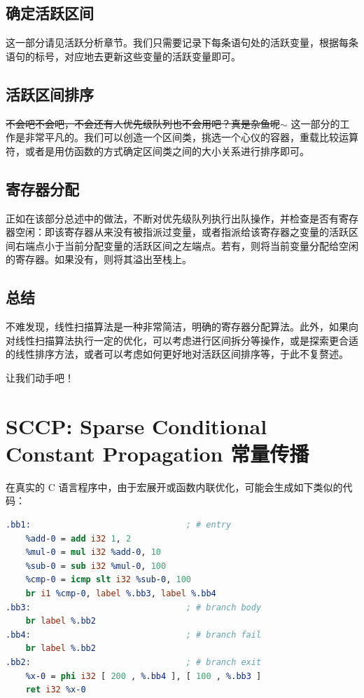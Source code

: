\subsection{确定活跃区间}
这一部分请见活跃分析章节。我们只需要记录下每条语句处的活跃变量，根据每条语句的标号，对应地去更新这些变量的活跃变量即可。

\subsection{活跃区间排序}
\sout{不会吧不会吧，不会还有人优先级队列也不会用吧？真是杂鱼呢$\sim$}
这一部分的工作是非常平凡的。我们可以创造一个区间类，挑选一个心仪的容器，重载比较运算符，或者是用仿函数的方式确定区间类之间的大小关系进行排序即可。

\subsection{寄存器分配}
正如在该部分总述中的做法，不断对优先级队列执行出队操作，并检查是否有寄存器空闲：即该寄存器从来没有被指派过变量，或者指派给该寄存器之变量的活跃区间右端点小于当前分配变量的活跃区间之左端点。若有，则将当前变量分配给空闲的寄存器。如果没有，则将其溢出至栈上。

\subsection{总结}
不难发现，线性扫描算法是一种非常简洁，明确的寄存器分配算法。此外，如果向对线性扫描算法执行一定的优化，可以考虑进行区间拆分等操作，或是探索更合适的线性排序方法，或者可以考虑如何更好地对活跃区间排序等，于此不复赘述。

让我们动手吧！

\section{SCCP: Sparse Conditional Constant Propagation 常量传播}

在真实的 C 语言程序中，由于宏展开或函数内联优化，可能会生成如下类似的代码：

\begin{lstlisting}[language=LLVM]
.bb1:								; # entry
    %add-0 = add i32 1, 2
    %mul-0 = mul i32 %add-0, 10
    %sub-0 = sub i32 %mul-0, 100
    %cmp-0 = icmp slt i32 %sub-0, 100
    br i1 %cmp-0, label %.bb3, label %.bb4
.bb3:								; # branch body
    br label %.bb2
.bb4:								; # branch fail
    br label %.bb2
.bb2:								; # branch exit
    %x-0 = phi i32 [ 200 , %.bb4 ], [ 100 , %.bb3 ]
    ret i32 %x-0
\end{lstlisting}

